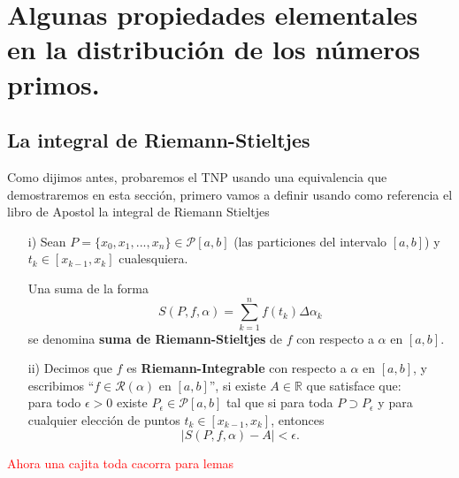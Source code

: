 \documentclass[12pt]{article}
\begin{document}
\begin{eg}
    \lipsum[1]
\end{eg}


\section{Algunas propiedades elementales en la distribución de los números primos.}

\subsection{La integral de Riemann-Stieltjes}

Como dijimos antes, probaremos el TNP usando una equivalencia que demostraremos en esta sección, primero vamos a definir usando como referencia el libro de Apostol \cite{Apostol:105425} la integral de Riemann Stieltjes

\begin{definition}
    \begin{itemize}\item[i)] Sean $P=\{x_0,x_1,...,x_n\}\in\mathcal{P}[a,b]$ (las particiones del intervalo $[a,b]$) y   $t_{k}\in [x_{k-1},x_k]$ cualesquiera. 
    
    Una suma de la forma $$S(P,f,\alpha)=\sum_{k=1}^{n}f(t_k)\Delta \alpha_k$$ se denomina \textbf{suma de Riemann-Stieltjes} de $f$ con respecto a $\alpha$ en $[a,b]$.
    
    \item[ii)] Decimos que $f$ es \textbf{Riemann-Integrable} con respecto a $\alpha$ en $[a,b]$, y escribimos ``$f\in \mathcal{R}(\alpha)$ en $[a,b]$'', si existe $A\in \mathbb R$ que satisface que:\\ 
    para todo $\epsilon>0$ existe $P_{\epsilon}\in \mathcal{P}[a,b]$ tal que si para toda $P\supset P_{\epsilon}$ y para cualquier elección de puntos $t_{k}\in [x_{k-1},x_k]$, entonces $$\mid S(P,f,\alpha) - A\mid <\epsilon.$$
    \end{itemize}
\end{definition}


\begin{prop}
    \lipsum[3]
\end{prop}

\textcolor{red}{Ahora una cajita toda cacorra para lemas\\
}

\begin{lemma}
    \lipsum[2]
\end{lemma}
\end{document}
